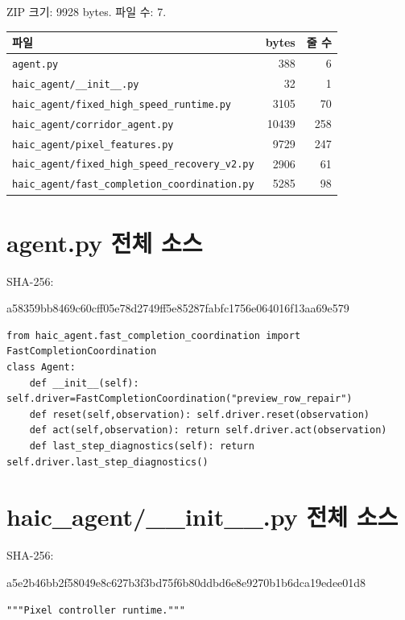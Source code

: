 \documentclass[11pt,a4paper]{article}
\newcommand{\code}[1]{{\small\nolinkurl{#1}}}
\begin{document}
ZIP 크기: 9928 bytes. 파일 수: 7.
\begin{longtable}{@{}p{75mm}rr@{}}\toprule 파일 & bytes & 줄 수 \\\midrule\endhead
\code{agent.py} & 388 & 6 \\
\code{haic_agent/__init__.py} & 32 & 1 \\
\code{haic_agent/fixed_high_speed_runtime.py} & 3105 & 70 \\
\code{haic_agent/corridor_agent.py} & 10439 & 258 \\
\code{haic_agent/pixel_features.py} & 9729 & 247 \\
\code{haic_agent/fixed_high_speed_recovery_v2.py} & 2906 & 61 \\
\code{haic_agent/fast_completion_coordination.py} & 5285 & 98 \\
\bottomrule\end{longtable}

\clearpage
\section{agent.py 전체 소스}
{\footnotesize SHA-256:\par\ttfamily a58359bb8469c60cff05e78d2749ff5e85287fabfc1756e064016f13aa69e579}
\begin{lstlisting}
from haic_agent.fast_completion_coordination import FastCompletionCoordination
class Agent:
    def __init__(self): self.driver=FastCompletionCoordination("preview_row_repair")
    def reset(self,observation): self.driver.reset(observation)
    def act(self,observation): return self.driver.act(observation)
    def last_step_diagnostics(self): return self.driver.last_step_diagnostics()

\end{lstlisting}

\clearpage
\section{haic\_agent/\_\_init\_\_.py 전체 소스}
{\footnotesize SHA-256:\par\ttfamily a5e2b46bb2f58049e8c627b3f3bd75f6b80ddbd6e8e9270b1b6dca19edee01d8}
\begin{lstlisting}
"""Pixel controller runtime."""

\end{lstlisting}

\clearpage
\end{document}
